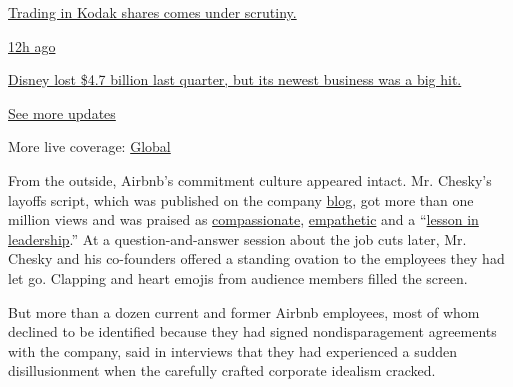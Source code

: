 \href{https://www.nytimes.com/live/2020/08/04/business/stock-market-today-coronavirus?action=click\&pgtype=Article\&state=default\&region=MAIN_CONTENT_1\&context=storylines_live_updates\#trading-in-kodak-shares-comes-under-scrutiny}{Trading
in Kodak shares comes under scrutiny.}

\href{https://www.nytimes.com/live/2020/08/04/business/stock-market-today-coronavirus?action=click\&pgtype=Article\&state=default\&region=MAIN_CONTENT_1\&context=storylines_live_updates\#disney-lost-4-7-billion-last-quarter-but-its-newest-business-was-a-big-hit}{12h
ago}

\href{https://www.nytimes.com/live/2020/08/04/business/stock-market-today-coronavirus?action=click\&pgtype=Article\&state=default\&region=MAIN_CONTENT_1\&context=storylines_live_updates\#disney-lost-4-7-billion-last-quarter-but-its-newest-business-was-a-big-hit}{Disney
lost \$4.7 billion last quarter, but its newest business was a big hit.}

\href{https://www.nytimes.com/live/2020/08/04/business/stock-market-today-coronavirus?action=click\&pgtype=Article\&state=default\&region=MAIN_CONTENT_1\&context=storylines_live_updates}{See
more updates}

More live coverage:
\href{https://www.nytimes.com/2020/08/04/world/coronavirus-cases.html?action=click\&pgtype=Article\&state=default\&region=MAIN_CONTENT_1\&context=storylines_live_updates}{Global}

From the outside, Airbnb's commitment culture appeared intact. Mr.
Chesky's layoffs script, which was published on the company
\href{https://news.airbnb.com/a-message-from-co-founder-and-ceo-brian-chesky/}{blog},
got more than one million views and was praised as
\href{https://www.businessinsider.com/airbnb-ceo-brian-chesky-layoffs-show-respect-compassion-for-employees-2020-5}{compassionate},
\href{https://www.prnewsonline.com/airbnb-ceo-delivers-empathetic-transparent-message-regarding-layoffs/}{empathetic}
and a
``\href{https://www.inc.com/jason-aten/lessons-behind-airbnb-ceos-email-about-laying-off-1900-workers.html}{lesson
in leadership}.'' At a question-and-answer session about the job cuts
later, Mr. Chesky and his co-founders offered a standing ovation to the
employees they had let go. Clapping and heart emojis from audience
members filled the screen.

But more than a dozen current and former Airbnb employees, most of whom
declined to be identified because they had signed nondisparagement
agreements with the company, said in interviews that they had
experienced a sudden disillusionment when the carefully crafted
corporate idealism cracked.

